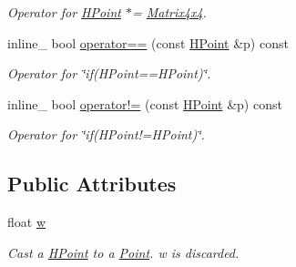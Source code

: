 \begin{DoxyCompactItemize}
\begin{DoxyCompactList}\small\item\em Operator for \hyperlink{classHPoint}{H\+Point} $\ast$= \hyperlink{classMatrix4x4}{Matrix4x4}. \end{DoxyCompactList}\item 
inline\+\_\+ bool \hyperlink{classHPoint_a791b07e47cf68ce4d314cd40533183a0}{operator==} (const \hyperlink{classHPoint}{H\+Point} \&p) const \hypertarget{classHPoint_a791b07e47cf68ce4d314cd40533183a0}{}\label{classHPoint_a791b07e47cf68ce4d314cd40533183a0}

\begin{DoxyCompactList}\small\item\em Operator for \char`\"{}if(\+H\+Point==\+H\+Point)\char`\"{}. \end{DoxyCompactList}\item 
inline\+\_\+ bool \hyperlink{classHPoint_a9c320547a4b02d18144cea3d2703170b}{operator!=} (const \hyperlink{classHPoint}{H\+Point} \&p) const \hypertarget{classHPoint_a9c320547a4b02d18144cea3d2703170b}{}\label{classHPoint_a9c320547a4b02d18144cea3d2703170b}

\begin{DoxyCompactList}\small\item\em Operator for \char`\"{}if(\+H\+Point!=\+H\+Point)\char`\"{}. \end{DoxyCompactList}\end{DoxyCompactItemize}
\subsection*{Public Attributes}
\begin{DoxyCompactItemize}
\item 
float \hyperlink{classHPoint_a3d75bd98937cbdfefad4efa0c1761ec4}{w}\hypertarget{classHPoint_a3d75bd98937cbdfefad4efa0c1761ec4}{}\label{classHPoint_a3d75bd98937cbdfefad4efa0c1761ec4}

\begin{DoxyCompactList}\small\item\em Cast a \hyperlink{classHPoint}{H\+Point} to a \hyperlink{classPoint}{Point}. w is discarded. \end{DoxyCompactList}\end{DoxyCompactItemize}
